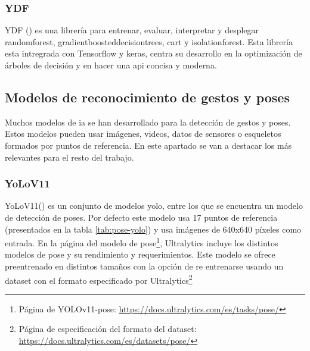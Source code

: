 \subsubsection{YDF}
YDF (\cite{GBBSP23}) es una librería para entrenar, evaluar, interpretar y desplegar \gls{randomforest}, \glspl{gradientboosteddecisiontree}, \gls{cart} y \gls{isolationforest}. Esta librería esta intregrada con Tensorflow y keras, centra su desarrollo en la optimización de árboles de decisión y en hacer una \gls{api} concisa y moderna.

\subsection{Modelos de reconocimiento de gestos y poses}

Muchos modelos de \gls{ia} se han desarrollado para la detección de gestos y poses. Estos modelos pueden usar imágenes, videos, datos de sensores o esqueletos formados por puntos de referencia. En este apartado se van a destacar los más relevantes para el resto del trabajo.

\subsubsection{YoLoV11}
YoLoV11(\cite{Jocher_Ultralytics_YOLO_2023}) es un conjunto de modelos \gls{yolo}, entre los que se encuentra un modelo de detección de poses. Por defecto este modelo usa 17 puntos de referencia (presentados en la tabla \ref{tab:pose-yolo}) y usa imágenes de 640x640 píxeles como entrada. En la página del modelo de pose\footnote{Página de YOLOv11-pose: \url{https://docs.ultralytics.com/es/tasks/pose/}}, Ultralytics incluye los distintos modelos de pose y su rendimiento y requerimientos. Este modelo se ofrece preentrenado en distintos tamaños con la opción de re entrenarse usando un dataset con el formato especificado por Ultralytics\footnote{Página de especificación del formato del dataset: \url{https://docs.ultralytics.com/es/datasets/pose/}}

